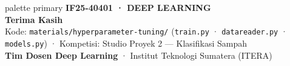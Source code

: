 \documentclass[t,aspectratio=169,xcolor={dvipsnames,table}]{beamer}
\begin{document}
\begin{frame}[plain]
  \begin{beamercolorbox}[wd=\paperwidth,ht=\paperheight,sep=1.5cm]{palette primary}
    \vspace{1.5cm}
    {\scriptsize\bfseries\color{dlMute}IF25-40401 · DEEP LEARNING}\\[0.4cm]
    {\Huge\bfseries Terima Kasih}\\[0.4cm]
    {\small Kode: \texttt{materials/hyperparameter-tuning/} (\texttt{train.py} · \texttt{datareader.py} · \texttt{models.py}) · Kompetisi: Studio Proyek 2 --- Klasifikasi Sampah}\\[1.0cm]
    \vfill
    {\scriptsize\textbf{Tim Dosen Deep Learning} · Institut Teknologi Sumatera (ITERA)}
  \end{beamercolorbox}
\end{frame}
\end{document}

